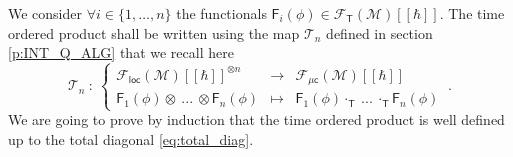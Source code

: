 \documentclass[11pt]{book}
\newcommand{\loc}{\mathsf{loc}}
\newcommand{\muc}{\mu\csf}
\newcommand{\Fcal}{\mathcal{F}}
\newcommand{\Mcal}{\mathcal{M}}
\newcommand{\Tcal}{\mathcal{T}}
\newcommand{\Fsf}{\mathsf{F}}
\newcommand{\Tsf}{\mathsf{T}}
\newcommand{\csf}{\mathsf{c}}
\theoremstyle{break}
\begin{document}
\bigskip


We consider $\forall i \in \{1,\dots,n\}$ the functionals $\Fsf_i(\phi) \in \Fcal_\Tsf(\Mcal)[[\hbar]]$. The time ordered product shall be written using the map $\Tcal_n$ defined in section \ref{p:INT_Q_ALG} that we recall here
%
\begin{equation*}
\Tcal_n \ : \ 
\left\{
\begin{array}{lcl}
\Fcal_{\loc}(\Mcal)[[\hbar]]^{\otimes n} & \to & \Fcal_{\muc}(\Mcal)[[\hbar]] \\
\Fsf_1(\phi) \otimes \ ... \ \otimes \Fsf_n(\phi) & \mapsto & \Fsf_1(\phi) \cdot_{\Tsf} \ ... \ \cdot_{\Tsf} \Fsf_n(\phi)
\end{array}
\right. \ .
\end{equation*}
%
We are going to prove by induction that the time ordered product is well defined up to the total diagonal \eqref{eq:total_diag}.
\end{document}
